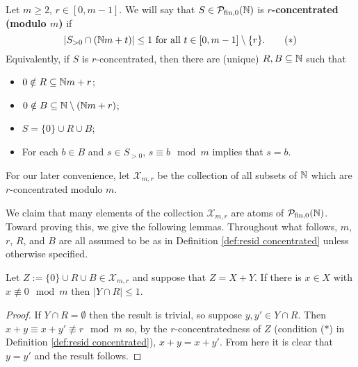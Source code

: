 \begin{defn} \label{def:resid concentrated}
Let $m\ge 2$, $r\in [0,m-1]$.
We will say that $S\in {\mathcal{P}_{\textrm{fin},0}(\mathbb{N})}$ is \textbf{$r$-concentrated (modulo $m$)} if
\[ |S_{>0} \cap (\mathbb{N} m + t)| \le 1 \textrm{ for all $t\in [0,m-1]\setminus\{r\}$.} \tag{$*$} \]
Equivalently, if $S$ is $r$-concentrated, then there are (unique) $R,B\subseteq \mathbb{N}$ such that
\begin{itemize}
	\item $0\notin R \subseteq \mathbb{N} m + r$;
	\item $0\notin B \subseteq \mathbb{N} \setminus (\mathbb{N} m + r)$;
	\item $S = \{0\} \cup R \cup B$;
	\item For each $b\in B$ and $s\in S_{>0}$, $s\equiv b \mod m$ implies that $s = b$.
\end{itemize}

For our later convenience, let $\mathcal{X}_{m,r}$ be the collection of all subsets of $\mathbb{N}$ which are $r$-concentrated modulo $m$.
\end{defn}

We claim that many elements of the collection $\mathcal{X}_{m,r}$ are atoms of ${\mathcal{P}_{\textrm{fin},0}(\mathbb{N})}$.
Toward proving this, we give the following lemmas.
Throughout what follows, $m$, $r$, $R$, and $B$ are all assumed to be as in Definition \ref{def:resid concentrated} unless otherwise specified.

\begin{lemma} \label{lem:other summand small}
Let $Z := \{0\}\cup R \cup B\in \mathcal{X}_{m,r}$ and suppose that $Z = X+Y$.
If there is $x\in X$ with $x\not\equiv 0 \mod m$ then $|Y\cap R| \le 1$.
\end{lemma}

\begin{proof}
If $Y\cap R=\emptyset$ then the result is trivial, so suppose $y,y'\in Y\cap R$.
Then $x+y \equiv x+y' \not\equiv r \mod m$ so, by the $r$-concentratedness of $Z$ (condition ($*$) in Definition \ref{def:resid concentrated}), $x+y = x+y'$.
From here it is clear that $y=y'$ and the result follows.
\end{proof}

